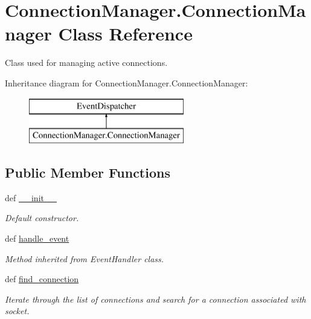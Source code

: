 \hypertarget{class_connection_manager_1_1_connection_manager}{\section{Connection\-Manager.\-Connection\-Manager Class Reference}
\label{class_connection_manager_1_1_connection_manager}
}


Class used for managing active connections.  


Inheritance diagram for Connection\-Manager.\-Connection\-Manager\-:\begin{figure}[H]
\begin{center}
\leavevmode
\includegraphics[height=2.000000cm]{class_connection_manager_1_1_connection_manager}
\end{center}
\end{figure}
\subsection*{Public Member Functions}
\begin{DoxyCompactItemize}
\item 
\hypertarget{class_connection_manager_1_1_connection_manager_af1b9f53192d93384ed9cb52b265ff0fd}{def \hyperlink{class_connection_manager_1_1_connection_manager_af1b9f53192d93384ed9cb52b265ff0fd}{\-\_\-\-\_\-init\-\_\-\-\_\-}}\label{class_connection_manager_1_1_connection_manager_af1b9f53192d93384ed9cb52b265ff0fd}

\begin{DoxyCompactList}\small\item\em Default constructor. \end{DoxyCompactList}\item 
def \hyperlink{class_connection_manager_1_1_connection_manager_a4a36c1328d67eacf11ea3ad11a892751}{handle\-\_\-event}
\begin{DoxyCompactList}\small\item\em Method inherited from Event\-Handler class. \end{DoxyCompactList}\item 
def \hyperlink{class_connection_manager_1_1_connection_manager_a36acc18652824eb9d1c23818ed55effb}{find\-\_\-connection}
\begin{DoxyCompactList}\small\item\em Iterate through the list of connections and search for a connection associated with socket. \end{DoxyCompactList}\end{DoxyCompactItemize}
